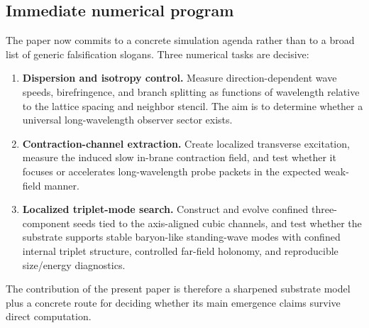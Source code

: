 \subsection{Immediate numerical program}
The paper now commits to a concrete simulation agenda rather than to a broad list of generic falsification slogans.
Three numerical tasks are decisive:
\begin{enumerate}
\item \textbf{Dispersion and isotropy control.}
Measure direction-dependent wave speeds, birefringence, and branch splitting as functions of wavelength relative to the
lattice spacing and neighbor stencil.
The aim is to determine whether a universal long-wavelength observer sector exists.

\item \textbf{Contraction-channel extraction.}
Create localized transverse excitation, measure the induced slow in-brane contraction field, and test whether it focuses
or accelerates long-wavelength probe packets in the expected weak-field manner.

\item \textbf{Localized triplet-mode search.}
Construct and evolve confined three-component seeds tied to the axis-aligned cubic channels, and test whether the
substrate supports stable baryon-like standing-wave modes with confined internal triplet structure, controlled far-field
holonomy, and reproducible size/energy diagnostics.
\end{enumerate}
The contribution of the present paper is therefore a sharpened substrate model plus a concrete route for deciding whether
its main emergence claims survive direct computation.
